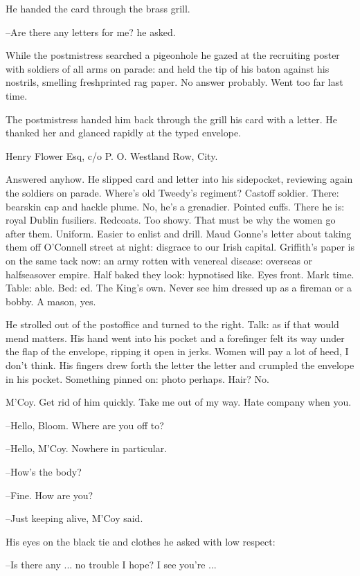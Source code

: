 He handed the card through the brass grill.

--Are there any letters for me?
he asked.

While the postmistress searched a pigeonhole
he gazed at the recruiting poster with soldiers of all arms on parade:
and held the tip of his baton against his nostrils,
smelling freshprinted rag paper.
No answer probably.
Went too far last time.

The postmistress handed him back through the grill
his card with a letter.
He thanked her and glanced rapidly at the typed envelope.


Henry Flower Esq,
c/o P. O. Westland Row,
City.


Answered anyhow.
He slipped card and letter into his sidepocket,
reviewing again the soldiers on parade.
Where's old Tweedy's regiment?
Castoff soldier.
There: bearskin cap and hackle plume.
No, he's a grenadier.
Pointed cuffs.
There he is: royal Dublin fusiliers.
Redcoats.
Too showy.
That must be why the women go after them.
Uniform.
Easier to enlist and drill.
Maud Gonne's letter about taking them off O'Connell street at night:
disgrace to our Irish capital.
Griffith's paper is on the same tack now:
an army rotten with venereal disease:
overseas or halfseasover empire.
Half baked they look:
hypnotised like.
Eyes front.
Mark time.
Table: able.
Bed: ed.
The King's own.
Never see him dressed up as a fireman or a bobby.
A mason, yes.

He strolled out of the postoffice and turned to the right.
Talk:
as if that would mend matters.
His hand went into his pocket
and a forefinger felt its way under the flap of the envelope,
ripping it open in jerks.
Women will pay a lot of heed, I don't think.
His fingers drew forth the letter
the letter and crumpled the envelope in his pocket.
Something pinned on:
photo perhaps.
Hair?
No.

M'Coy.
Get rid of him quickly.
Take me out of my way.
Hate company when you.

--Hello, Bloom.
Where are you off to?

--Hello, M'Coy.
Nowhere in particular.

--How's the body?

--Fine.
How are you?

--Just keeping alive,
M'Coy said.

His eyes on the black tie and clothes
he asked with low respect:

--Is there any ... no trouble I hope? I see you're ...

